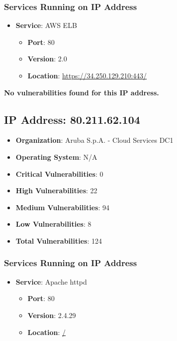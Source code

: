 \documentclass{article}
\begin{document}
\subsubsection*{Services Running on IP Address}

\begin{itemize}
    
        \item \textbf{Service}: AWS ELB
        \begin{itemize}
            \item \textbf{Port}: 80
            \item \textbf{Version}:  2.0 
            \item \textbf{Location}: \href{ https://34.250.129.210:443/ }{ https://34.250.129.210:443/ }
        \end{itemize}
    
\end{itemize}


\textbf{No vulnerabilities found for this IP address.}




\clearpage



\subsection*{IP Address: 80.211.62.104}

\begin{itemize}
    \item \textbf{Organization}: Aruba S.p.A. - Cloud Services DC1
    \item \textbf{Operating System}:  N/A 
    \item \textbf{Critical Vulnerabilities}: 0
    \item \textbf{High Vulnerabilities}: 22
    \item \textbf{Medium Vulnerabilities}: 94
    \item \textbf{Low Vulnerabilities}: 8
    \item \textbf{Total Vulnerabilities}: 124
\end{itemize}

\subsubsection*{Services Running on IP Address}

\begin{itemize}
    
        \item \textbf{Service}: Apache httpd
        \begin{itemize}
            \item \textbf{Port}: 80
            \item \textbf{Version}:  2.4.29 
            \item \textbf{Location}: \href{ / }{ / }
        \end{itemize}
    
\end{itemize}
\end{document}
